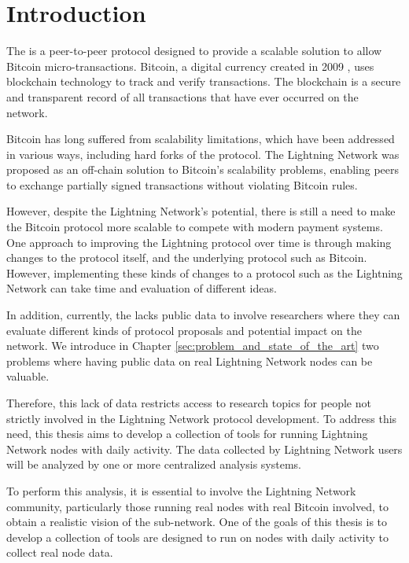\setcounter{page}{1}
\chapter*{Introduction}\label{sec:introduction}

The {\LN} \cite{lightning-network-paper} is a peer-to-peer protocol designed to
provide a scalable solution to allow Bitcoin micro-transactions.
Bitcoin, a digital currency created in 2009 \cite{nakamoto2009bitcoin}, uses blockchain technology
to track and verify transactions. The blockchain is a secure and transparent
record of all transactions that have ever occurred on the network.

Bitcoin has long suffered from scalability limitations, which have been
addressed in various ways, including hard forks of the protocol.
The Lightning Network was proposed as an off-chain solution to Bitcoin's
scalability problems, enabling peers to exchange partially signed transactions
without violating Bitcoin rules.

However, despite the Lightning Network's potential, there is still a need
to make the Bitcoin protocol more scalable to compete with modern payment systems.
One approach to improving the Lightning protocol over time is through making changes
to the protocol itself, and the underlying protocol such as Bitcoin. However,
implementing these kinds of changes to a protocol such as the Lightning Network
can take time and evaluation of different ideas.

In addition, currently, the {\LN} lacks public data to involve researchers
where they can evaluate different kinds of protocol proposals and
potential impact on the network. We introduce in Chapter \ref{sec:problem_and_state_of_the_art}
two problems where having public data on real Lightning Network nodes can be valuable.

Therefore, this lack of data restricts access to research topics for
people not strictly involved in the Lightning Network protocol development.
To address this need, this thesis aims to develop a collection of tools for
running Lightning Network nodes with daily activity. The data collected by
Lightning Network users will be analyzed by one or more centralized
analysis systems.

To perform this analysis, it is essential to involve the Lightning Network
community, particularly those running real nodes with real Bitcoin involved,
to obtain a realistic vision of the sub-network. 
One of the goals of this thesis is to develop a collection of 
tools are designed to run on nodes with daily activity to 
collect real node data.

